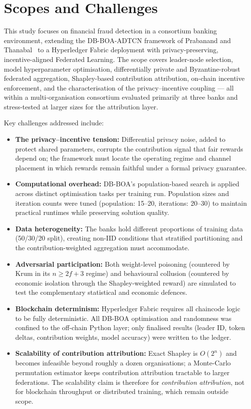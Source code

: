 \section{Scopes and Challenges}
This study focuses on financial fraud detection in a consortium banking environment, extending the DB-BOA-ADTCN framework of Prabanand and Thanabal~\cite{prabanand2025} to a Hyperledger Fabric deployment with privacy-preserving, incentive-aligned Federated Learning. The scope covers leader-node selection, model hyperparameter optimisation, differentially private and Byzantine-robust federated aggregation, Shapley-based contribution attribution, on-chain incentive enforcement, and the characterisation of the privacy--incentive coupling — all within a multi-organisation consortium evaluated primarily at three banks and stress-tested at larger sizes for the attribution layer.

Key challenges addressed include:

\begin{itemize}
\item \textbf{The privacy--incentive tension:} Differential privacy noise, added to protect shared parameters, corrupts the contribution signal that fair rewards depend on; the framework must locate the operating regime and channel placement in which rewards remain faithful under a formal privacy guarantee.
\item \textbf{Computational overhead:} DB-BOA's population-based search is applied across distinct optimisation tasks per training run. Population sizes and iteration counts were tuned (population: 15--20, iterations: 20--30) to maintain practical runtimes while preserving solution quality.
\item \textbf{Data heterogeneity:} The banks hold different proportions of training data (50/30/20 split), creating non-IID conditions that stratified partitioning and the contribution-weighted aggregation must accommodate.
\item \textbf{Adversarial participation:} Both weight-level poisoning (countered by Krum in its $n\ge 2f+3$ regime) and behavioural collusion (countered by economic isolation through the Shapley-weighted reward) are simulated to test the complementary statistical and economic defences.
\item \textbf{Blockchain determinism:} Hyperledger Fabric requires all chaincode logic to be fully deterministic. All DB-BOA optimisation and randomness was confined to the off-chain Python layer; only finalised results (leader ID, token deltas, contribution weights, model accuracy) were written to the ledger.
\item \textbf{Scalability of contribution attribution:} Exact Shapley is $O(2^n)$ and becomes infeasible beyond roughly a dozen organisations; a Monte-Carlo permutation estimator keeps contribution attribution tractable to larger federations. The scalability claim is therefore for \emph{contribution attribution}, not for blockchain throughput or distributed training, which remain outside scope.
\end{itemize}

